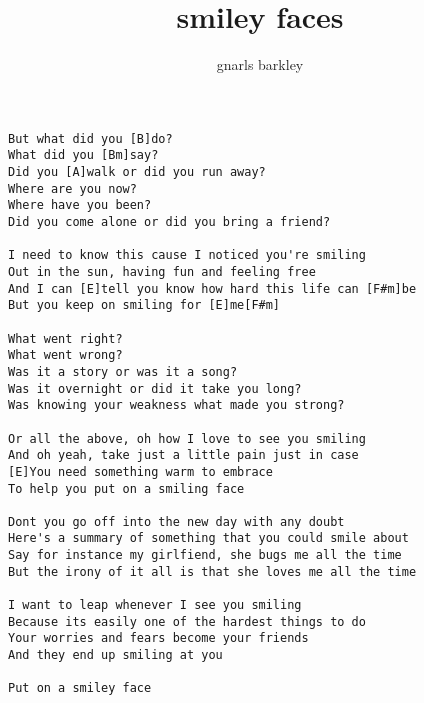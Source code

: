 \author{gnarls barkley}
\title{smiley faces}
\maketitle
\begin{verbatim}
But what did you [B]do?
What did you [Bm]say?
Did you [A]walk or did you run away?
Where are you now?
Where have you been?
Did you come alone or did you bring a friend?

I need to know this cause I noticed you're smiling
Out in the sun, having fun and feeling free
And I can [E]tell you know how hard this life can [F#m]be
But you keep on smiling for [E]me[F#m]

What went right?
What went wrong?
Was it a story or was it a song?
Was it overnight or did it take you long?
Was knowing your weakness what made you strong?

Or all the above, oh how I love to see you smiling
And oh yeah, take just a little pain just in case
[E]You need something warm to embrace
To help you put on a smiling face

Dont you go off into the new day with any doubt
Here's a summary of something that you could smile about
Say for instance my girlfiend, she bugs me all the time
But the irony of it all is that she loves me all the time

I want to leap whenever I see you smiling
Because its easily one of the hardest things to do
Your worries and fears become your friends
And they end up smiling at you

Put on a smiley face
\end{verbatim}
